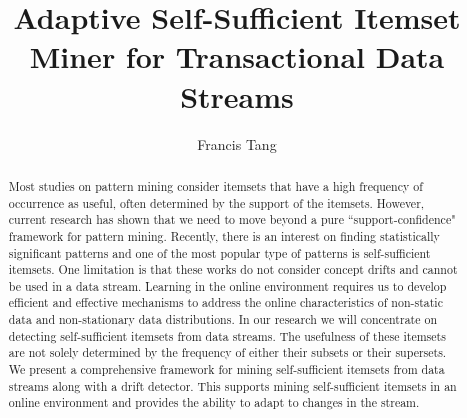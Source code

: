 \documentclass[12pt,examcopy]{uathesis}
\theoremstyle{definition}
\begin{document}
\title{Adaptive Self-Sufficient Itemset Miner for Transactional Data Streams}
\author{Francis Tang}
\maketitle

\frontmatter
\begin{abstract}
Most studies on pattern mining consider itemsets that have a high frequency of occurrence as useful, often determined by the support of the itemsets. However, current research has shown that we need to move beyond a pure ``support-confidence" framework for pattern mining. Recently, there is an interest on finding statistically significant patterns and one of the most popular type of patterns is self-sufficient itemsets. One limitation is that these works do not consider concept drifts and cannot be used in a data stream. Learning in the online environment requires us to develop efficient and effective mechanisms to address the online characteristics of non-static data and non-stationary data distributions. In our research we will concentrate on detecting self-sufficient itemsets from data streams. The usefulness of these itemsets are not solely determined by the frequency of either their subsets or their supersets. We present a comprehensive framework for mining self-sufficient itemsets from data streams along with a drift detector. This supports mining self-sufficient itemsets in an online environment and provides the ability to adapt to changes in the stream.
\end{abstract}
\end{document}
